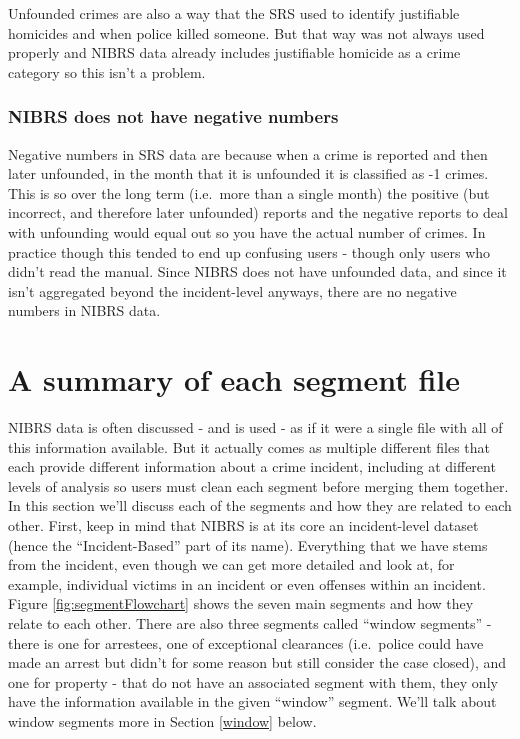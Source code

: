 \documentclass[
]{krantz}
\begin{document}
Unfounded crimes are also a way that the SRS used to
identify justifiable homicides and when police killed
someone. But that way was not always used properly and NIBRS
data already includes justifiable homicide as a crime
category so this isn't a problem.

\subsubsection{NIBRS does not have negative
numbers}\label{nibrs-does-not-have-negative-numbers}

Negative numbers in SRS data are because when a crime is
reported and then later unfounded, in the month that it is
unfounded it is classified as -1 crimes. This is so over the
long term (i.e.~more than a single month) the positive (but
incorrect, and therefore later unfounded) reports and the
negative reports to deal with unfounding would equal out so
you have the actual number of crimes. In practice though
this tended to end up confusing users - though only users
who didn't read the manual. Since NIBRS does not have
unfounded data, and since it isn't aggregated beyond the
incident-level anyways, there are no negative numbers in
NIBRS data.

\section{A summary of each segment
file}\label{a-summary-of-each-segment-file}

NIBRS data is often discussed - and is used - as if it were
a single file with all of this information available. But it
actually comes as multiple different files that each provide
different information about a crime incident, including at
different levels of analysis so users must clean each
segment before merging them together. In this section we'll
discuss each of the segments and how they are related to
each other. First, keep in mind that NIBRS is at its core an
incident-level dataset (hence the ``Incident-Based'' part of
its name). Everything that we have stems from the incident,
even though we can get more detailed and look at, for
example, individual victims in an incident or even offenses
within an incident. Figure \ref{fig:segmentFlowchart} shows
the seven main segments and how they relate to each other.
There are also three segments called ``window segments'' -
there is one for arrestees, one of exceptional clearances
(i.e.~police could have made an arrest but didn't for some
reason but still consider the case closed), and one for
property - that do not have an associated segment with them,
they only have the information available in the given
``window'' segment. We'll talk about window segments more in
Section \ref{window} below.
\end{document}
